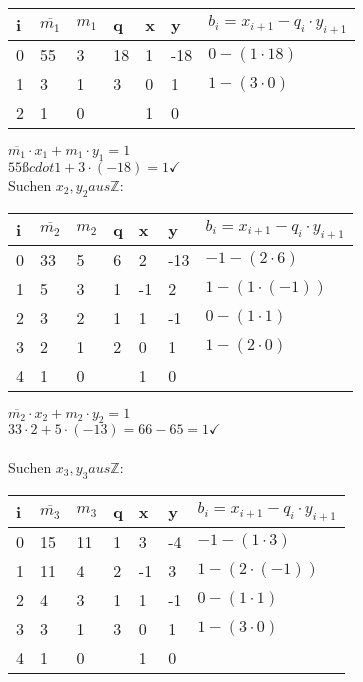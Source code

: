 \documentclass[11pt,a4paper]{article}
\begin{document}
\begin{center}
	\begin{tabular}{ | l | l | l | l | l | l | l|}
		\hline
		i&$\overline{m_1}$&$m_1$&q&x&y&$b_i=x_{i+1}-q_i \cdot y_{i+1} $ \\ \hline \hline		
		0&55&3&18&1&-18&$0-(1 \cdot 18 )$ \\ \hline
		1&3&1&3&0&1&$1-(3 \cdot 0 )$ \\ \hline
		2&1&0&&1&0&\\ \hline	
	\end{tabular}
\end{center}
$\overline{m_1} \cdot x_1 + m_1 \cdot y_1 = 1$\\
$55 ßcdot 1 + 3\cdot (-18) = 1 \checkmark$
\\
Suchen $x_2,y_2 aus \mathbb{Z}:$\\
\begin{center}
	\begin{tabular}{ | l | l | l | l | l | l | l|}
		\hline
		i&$\overline{m_2}$&$m_2$&q&x&y&$b_i=x_{i+1}-q_i \cdot y_{i+1} $ \\ \hline \hline
		0&33&5&6&2&-13&$-1-(2 \cdot 6 )$ \\ \hline
		1&5&3&1&-1&2&$1-(1 \cdot (-1))$ \\ \hline
		2&3&2&1&1&-1&$0-(1 \cdot 1)$ \\ \hline
		3&2&1&2&0&1&$1-(2\cdot 0)$ \\ \hline
		4&1&0&&1&0&\\ \hline
	\end{tabular}
\end{center}
$\overline{m_2} \cdot x_2 + m_2 \cdot y_2 = 1$\\
$33\cdot 2 + 5 \cdot (-13) = 66-65 = 1 \checkmark$\\
\\
Suchen $x_3,y_3 aus \mathbb{Z}:$\\
\begin{center}
	\begin{tabular}{ | l | l | l | l | l | l | l|}
		\hline
		i&$\overline{m_3}$&$m_3$&q&x&y&$b_i=x_{i+1}-q_i \cdot y_{i+1} $ \\ \hline \hline
		0&15&11&1&3&-4&$-1-(1 \cdot 3 )$ \\ \hline
		1&11&4&2&-1&3&$1-(2 \cdot (-1))$ \\ \hline
		2&4&3&1&1&-1&$0-(1 \cdot 1)$ \\ \hline
		3&3&1&3&0&1&$1-(3\cdot 0)$ \\ \hline
		4&1&0&&1&0&\\ \hline
	\end{tabular}
\end{center}
\end{document}
